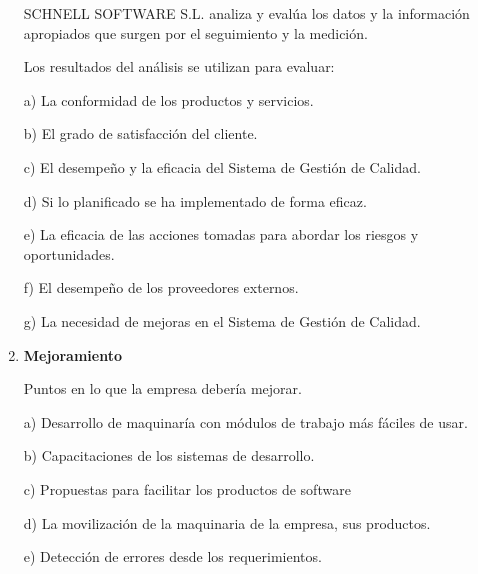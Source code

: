 \documentclass[10pt,a4paper]{article}
\begin{document}
\begin{enumerate}
SCHNELL SOFTWARE S.L. analiza y evalúa los datos y la información apropiados que surgen por el seguimiento y la
medición.

Los resultados del análisis se utilizan para evaluar:

a) La conformidad de los productos y servicios.

b) El grado de satisfacción del cliente.

c) El desempeño y la eficacia del Sistema de Gestión de Calidad.

d) Si lo planificado se ha implementado de forma eficaz.

e) La eficacia de las acciones tomadas para abordar los riesgos y oportunidades.

f) El desempeño de los proveedores externos.

g) La necesidad de mejoras en el Sistema de Gestión de Calidad.

\item \textbf{Mejoramiento}

Puntos en lo que la empresa debería mejorar.

a) Desarrollo de maquinaría con módulos de trabajo más fáciles de usar.

b) Capacitaciones de los sistemas de desarrollo.

c) Propuestas para facilitar los productos de software

d) La movilización de la maquinaria de la empresa, sus productos.

e) Detección de errores desde los requerimientos. 


\end{enumerate}
\end{document}
